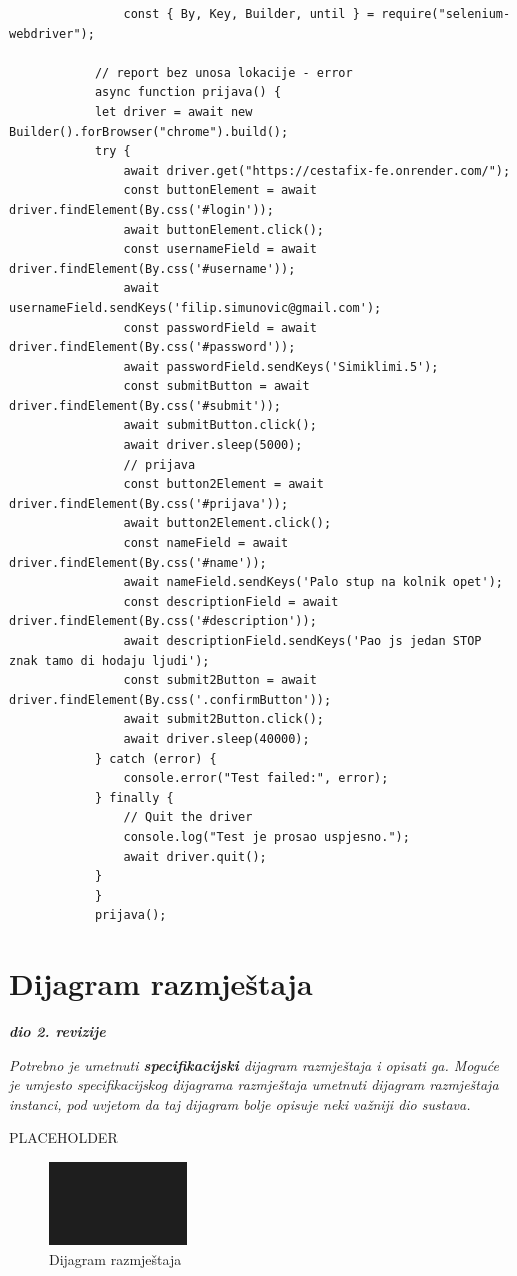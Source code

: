 			\begin{verbatim}
				const { By, Key, Builder, until } = require("selenium-webdriver");

			// report bez unosa lokacije - error
			async function prijava() {
			let driver = await new Builder().forBrowser("chrome").build();
			try {
				await driver.get("https://cestafix-fe.onrender.com/");
				const buttonElement = await driver.findElement(By.css('#login'));
				await buttonElement.click();
				const usernameField = await driver.findElement(By.css('#username'));
				await usernameField.sendKeys('filip.simunovic@gmail.com');
				const passwordField = await driver.findElement(By.css('#password'));
				await passwordField.sendKeys('Simiklimi.5');
				const submitButton = await driver.findElement(By.css('#submit'));
				await submitButton.click();
				await driver.sleep(5000);
				// prijava
				const button2Element = await driver.findElement(By.css('#prijava'));
				await button2Element.click();
				const nameField = await driver.findElement(By.css('#name'));
				await nameField.sendKeys('Palo stup na kolnik opet');
				const descriptionField = await driver.findElement(By.css('#description'));
				await descriptionField.sendKeys('Pao js jedan STOP znak tamo di hodaju ljudi');
				const submit2Button = await driver.findElement(By.css('.confirmButton'));
				await submit2Button.click();
				await driver.sleep(40000);
			} catch (error) {
				console.error("Test failed:", error);
			} finally {
				// Quit the driver
				console.log("Test je prosao uspjesno.");
				await driver.quit();
			}
			}
			prijava();
			\end{verbatim}

			
			\eject 
		
		\section{Dijagram razmještaja}
			
			\textbf{\textit{dio 2. revizije}}
			
			 \textit{Potrebno je umetnuti \textbf{specifikacijski} dijagram razmještaja i opisati ga. Moguće je umjesto specifikacijskog dijagrama razmještaja umetnuti dijagram razmještaja instanci, pod uvjetom da taj dijagram bolje opisuje neki važniji dio sustava.}
			
			PLACEHOLDER
		
			\begin{figure}[H]
				\includegraphics[scale=0.60]{slike/DR.jpg} %
				\centering
				\caption{Dijagram razmještaja}
				\label{fig:DijagramRazmjestaja}
			\end{figure}

